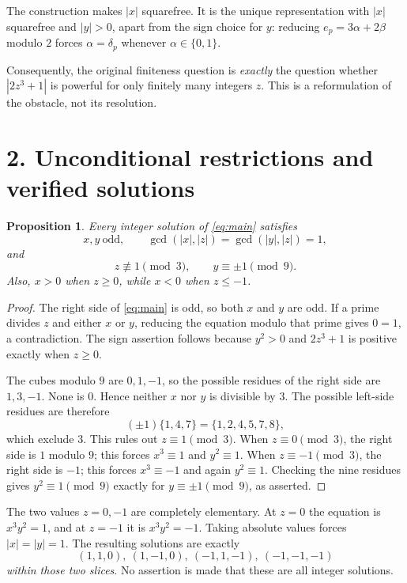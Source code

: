 \documentclass[11pt,a4paper]{article}
\newtheorem{proposition}{Proposition}
\begin{document}
The construction makes $|x|$ squarefree. It is the unique representation
with $|x|$ squarefree and $|y|>0$, apart from the sign choice for $y$:
reducing $e_p=3\alpha+2\beta$ modulo $2$ forces
$\alpha=\delta_p$ whenever $\alpha\in\{0,1\}$.

Consequently, the original finiteness question is \emph{exactly} the question
whether $|2z^3+1|$ is powerful for only finitely many integers $z$.
This is a reformulation of the obstacle, not its resolution.

\newpage
\section*{2. Unconditional restrictions and verified solutions}
\begin{proposition}\label{prop:restrictions}
Every integer solution of \eqref{eq:main} satisfies
\[
 x,y\ \text{odd},\qquad
 \gcd(|x|,|z|)=\gcd(|y|,|z|)=1,
\]
and
\[
 z\not\equiv1\pmod3,\qquad y\equiv\pm1\pmod9.
\]
Also, $x>0$ when $z\ge0$, while $x<0$ when $z\le-1$.
\end{proposition}
\begin{proof}
The right side of \eqref{eq:main} is odd, so both $x$ and $y$ are odd.
If a prime divides $z$ and either $x$ or $y$, reducing the equation modulo
that prime gives $0=1$, a contradiction. The sign assertion follows because
$y^2>0$ and $2z^3+1$ is positive exactly when $z\ge0$.

The cubes modulo $9$ are $0,1,-1$, so the possible residues of the right
side are $1,3,-1$. None is $0$. Hence neither $x$ nor $y$ is divisible by
$3$. The possible left-side residues are therefore
\[
 (\pm1)\{1,4,7\}=\{1,2,4,5,7,8\},
\]
which exclude $3$. This rules out $z\equiv1\pmod3$. When $z\equiv0\pmod3$,
the right side is $1$ modulo $9$; this forces $x^3\equiv1$ and
$y^2\equiv1$. When $z\equiv-1\pmod3$, the right side is $-1$; this forces
$x^3\equiv-1$ and again $y^2\equiv1$. Checking the nine residues gives
$y^2\equiv1\pmod9$ exactly for $y\equiv\pm1\pmod9$, as asserted.
\end{proof}

The two values $z=0,-1$ are completely elementary. At $z=0$ the equation is
$x^3y^2=1$, and at $z=-1$ it is $x^3y^2=-1$. Taking absolute values forces
$|x|=|y|=1$. The resulting solutions are exactly
\[
 \boxed{(1,1,0),\ (1,-1,0),\ (-1,1,-1),\ (-1,-1,-1)}
\]
\emph{within those two slices}. No assertion is made that these are all
integer solutions.
\end{document}
